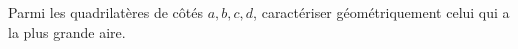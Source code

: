 Parmi les quadrilatères de côtés $a, b, c, d$, caractériser géométriquement celui qui a la plus grande aire.